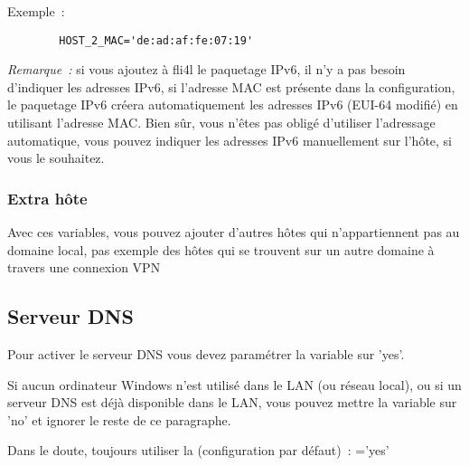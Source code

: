 \begin{description}
{      Exemple~:

\begin{example}
\begin{verbatim}
        HOST_2_MAC='de:ad:af:fe:07:19'
\end{verbatim}
\end{example}

      \emph{Remarque~:} si vous ajoutez à fli4l le paquetage IPv6, il n'y a pas
      besoin d'indiquer les adresses IPv6, si l'adresse MAC est présente dans
      la configuration, le paquetage IPv6 créera automatiquement les adresses
      IPv6 (EUI-64 modifié) en utilisant l'adresse MAC. Bien sûr, vous n'êtes
      pas obligé d'utiliser l'adressage automatique, vous pouvez indiquer
      les adresses IPv6 manuellement sur l'hôte, si vous le souhaitez.
      }
\end{description}


\subsubsection{Extra hôte}

\begin{description}

  {
      Avec ces variables, vous pouvez ajouter d'autres hôtes qui
      n'appartiennent pas au domaine local, pas exemple des hôtes qui
      se trouvent sur un autre domaine à travers une connexion VPN
  }
\end{description}


\subsection{Serveur DNS}

\begin{description}

    {Pour activer le serveur DNS vous devez paramétrer la variable 
    sur 'yes'.

    Si aucun ordinateur Windows n'est utilisé dans le LAN (ou réseau local), ou
    si un serveur DNS est déjà disponible dans le LAN, vous pouvez mettre la
    variable  sur 'no' et ignorer le reste de ce paragraphe.

    Dans le doute, toujours utiliser la (configuration par défaut)~: ='yes'}
\end{description}


